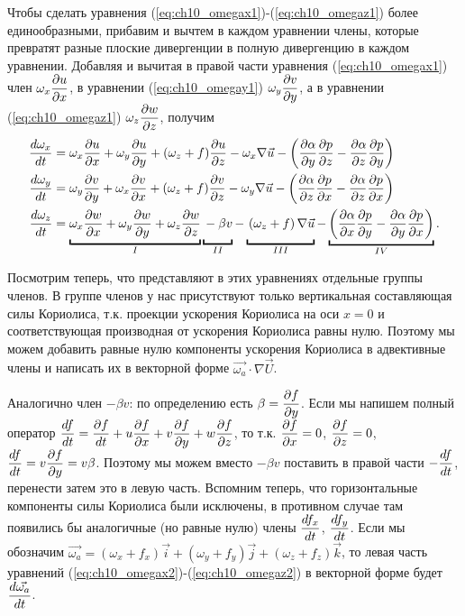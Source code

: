 Чтобы сделать уравнения (\ref{eq:ch10_omegax1})-(\ref{eq:ch10_omegaz1}) более единообразными, прибавим и вычтем в каждом уравнении члены, которые превратят разные плоские дивергенции в полную дивергенцию в каждом уравнении. Добавляя и вычитая в правой части уравнения (\ref{eq:ch10_omegax1}) член $\omega_x\displaystyle\frac{\partial u}{\partial x}$, в уравнении (\ref{eq:ch10_omegay1}) $\omega_y\displaystyle\frac{\partial v}{\partial y}$, а в уравнении (\ref{eq:ch10_omegaz1}) $\omega_z\displaystyle\frac{\partial w}{\partial z}$, получим 
\begin{align}
    \td{\omega_x}{t}&= \omega_x\pd{u}{x} + \omega_y\pd{u}{y} + (\omega_z+f)\pd{u}{z} - \omega_x\nabla\vec{u}-\left( \pd{\alpha}{y}\pd{p}{z} - \pd{\alpha}{z}\pd{p}{y} \right) \label{eq:ch10_omegax2} \\
    \td{\omega_y}{t}&=\omega_y\pd{v}{y} + \omega_x\pd{v}{x} + (\omega_z+f)\pd{v}{z} -\omega_y\nabla\vec{u}-\left( \pd{\alpha}{z}\pd{p}{x} - \pd{\alpha}{z}\pd{p}{x} \right) \label{eq:ch10_omegay2} \\
    \td{\omega_z}{t}& = 
    \ub{\omega_x\pd{w}{x} + \omega_y\pd{w}{y} + \omega_z\pd{w}{z}}_{\romans{1}} 
    \ub{\vphantom{\omega_x\pd{w}{x} + \omega_y\pd{w}{y} + \omega_z\pd{w}{z}}-\beta v}_{\romans{2}} - 
    \ub{\vphantom{\omega_x\pd{w}{x} + \omega_y\pd{w}{y} + \omega_z\pd{w}{z}}\left( \omega_z + f \right) \nabla\vec{u}}_{\romans{3}}-
    \ub{\left( \pd{\alpha}{x}\pd{p}{y} - \pd{\alpha}{y}\pd{p}{x} \right)}_{\romans{4}} \label{eq:ch10_omegaz2}.
\end{align}

Посмотрим теперь, что представляют в этих уравнениях отдельные группы членов. В группе членов  у нас присутствуют только вертикальная составляющая силы Кориолиса, т.к. проекции ускорения Кориолиса на оси $x=0$ и соответствующая производная от ускорения Кориолиса равны нулю. Поэтому мы можем добавить равные нулю компоненты ускорения Кориолиса в адвективные члены и написать их в векторной форме $\vec{\omega_a}\cdot\nabla\vec{U}$.  

Аналогично член  $- \beta v$: по определению есть $\beta=\displaystyle\frac{\partial f}{\partial y}$. Если мы напишем полный оператор $\displaystyle\frac{d f}{d t}=\displaystyle\frac{\partial f}{dt}+ u\frac{\partial f}{\partial x}+v\frac{\partial f}{\partial y}+w\frac{\partial f}{\partial z}$, то т.к. $\displaystyle\frac{\partial f}{\partial x}=0$, $\displaystyle\frac{\partial f}{\partial z}=0$, $\displaystyle\frac{d f}{d t}=v\displaystyle\frac{\partial f}{\partial y}=v\beta$. Поэтому мы можем вместо $-\beta v$ поставить в правой части $-\displaystyle\frac{d f}{d t}$, перенести затем это в левую часть. Вспомним теперь, что горизонтальные компоненты силы Кориолиса были исключены, в противном случае там появились бы аналогичные (но равные нулю)  члены $\displaystyle\frac{d f_x}{d t}$, $\displaystyle\frac{d f_y}{d t}$. Если мы обозначим $\vec{\omega_a}=(\omega_x+f_x)\vec{i}+(\omega_y+f_y)\vec{j}+(\omega_z+f_z)\vec{k}$, то левая часть уравнений (\ref{eq:ch10_omegax2})-(\ref{eq:ch10_omegaz2}) в векторной форме будет $\displaystyle\frac{d \vec{\omega_a}}{d t}$.

